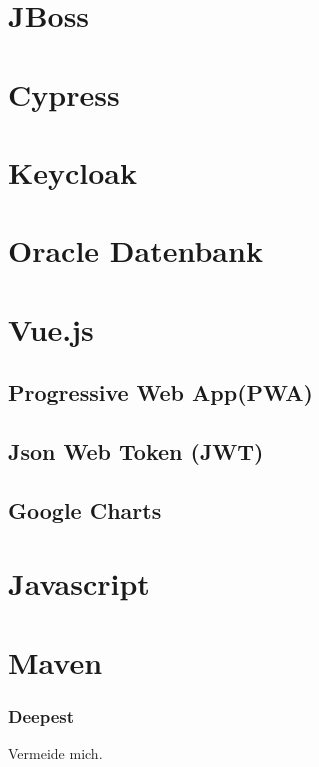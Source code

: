 \section{JBoss}

\section{Cypress}

\section{Keycloak}

\section{Oracle Datenbank}

\section{Vue.js}
\author{}

\subsection{Progressive Web App(PWA)}


\subsection{Json Web Token (JWT)}

\subsection{Google Charts}

\section{Javascript}

\section{Maven}

\subsubsection{Deepest}
Vermeide mich.